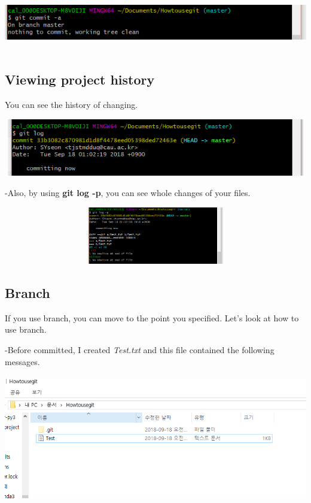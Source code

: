 \documentclass[11pt]{article}
\begin{document}
	\includegraphics[height=2.5cm, width=14cm]{gitcommita.PNG}

	\pagebreak
	\subsection{Viewing project history}
	You can see the history of changing.
	
	\includegraphics[height=2.5cm, width=14cm]{gitlog.PNG}
	
	-Also, by using \textbf{git log -p}, you can see whole changes of your files.

	\includegraphics[height=2.5cm, width=14cm]{gitlogp.PNG}
	
	\subsection{Branch}
	If you use branch, you can move to the point you specified. Let's look at how to use branch.

	-Before committed, I created \textit{Test.txt} and this file contained the following messages.

	\includegraphics[height=5.5cm, width=14cm]{branch.PNG}
	
\end{document}
